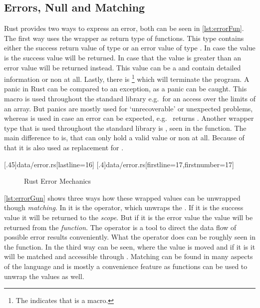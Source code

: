 \documentclass[thesis]{subfiles}
\begin{document}
  \subsection{Errors, Null and Matching}\label{sec:rustErr}
    Rust provides two ways to express an error, both can be seen in \autoref{lst:errorFun}.
    The first way uses the  wrapper as return type of functions.
    This type contains either the success return value of type \T or an error value of type .
    In case the value is  the success value will be returned.
    In case that the value is greater than  an error value will be returned instead.
    This value can be a \struct and contain detailed information or non at all.
    Lastly, there is \footnote{%
      The \codr{!} indicates that  is a macro.
    } which will terminate the program.
    A panic in Rust can be compared to an exception, as a panic can be caught\autocite[std::panic::catch\_unwind]{rust-doc}.
    This macro is used throughout the standard library e.g.~for an access over the limits of an array.
    But panics are mostly used for `unrecoverable' or unexpected problems, whereas  is used in case an error can be expected, e.g.~ returns .
    Another wrapper type that is used throughout the standard library is \OptionT, seen in the  function.
    The main difference to  is, that  can only hold a valid value or non at all.
    Because of that it is also used as replacement for .

    \LstTikzBox{\errorFun}[.45\linewidth]{data/error.rs}[lastline=16]
    \LstTikzBox{\errorGun}[.4\linewidth]{data/error.rs}[firstline=17,firstnumber=17]

    \begin{figure}[ht]
      \captionsetup{type=lstlisting}
       \hfill%
      \caption{Rust Error Mechanics}\label{lst:error}
    \end{figure}

    \autoref{lst:errorGun} shows three ways how these wrapped values can be unwrapped though \emph{matching}.
    In  it is the  operator, which unwraps the .
    If it is the success value it will be returned to the \emph{scope}.
    But if it is the error value the value will be returned from the \emph{function}.
    The  operator is a tool to direct the data flow of possible error results conveniently.
    What the  operator does can be roughly seen in the  function.
    In  the third way can be seen, where the \OptionT value is moved and if it is \Some it will be matched and accessible through .
    Matching can be found in many aspects of the language and is mostly a convenience feature as functions can be used to unwrap the values as well.
    \autocite[Enums and Pattern Matching]{rust-doc}
\end{document}

